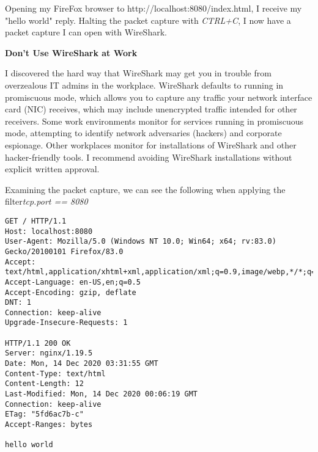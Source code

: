 Opening my FireFox browser to http://localhost:8080/index.html, I receive my "hello world" reply.  Halting the packet capture with \textit{CTRL+C}, I now have a packet capture I can open with WireShark.

\begin{sidebar}
\begin{center}
\textbf{Don't Use WireShark at Work}
\end{center}
I discovered the hard way that WireShark may get you in trouble from overzealous IT admins in the workplace.  WireShark defaults to running in promiscuous mode, which allows you to capture any traffic your network interface card (NIC) receives, which may include unencrypted traffic intended for other receivers.  Some work environments monitor for services running in promiscuous mode, attempting to identify network adversaries (hackers) and corporate espionage.  Other workplaces monitor for installations of WireShark and other hacker-friendly tools.  I recommend avoiding WireShark installations without explicit written approval.
\end{sidebar}

Examining the packet capture, we can see the following when applying the filter\textit{tcp.port == 8080}

\begin{code}
\vspace{-\baselineskip}
\begin{lstlisting}[belowskip=-\baselineskip]
GET / HTTP/1.1
Host: localhost:8080
User-Agent: Mozilla/5.0 (Windows NT 10.0; Win64; x64; rv:83.0) Gecko/20100101 Firefox/83.0
Accept: text/html,application/xhtml+xml,application/xml;q=0.9,image/webp,*/*;q=0.8
Accept-Language: en-US,en;q=0.5
Accept-Encoding: gzip, deflate
DNT: 1
Connection: keep-alive
Upgrade-Insecure-Requests: 1

HTTP/1.1 200 OK
Server: nginx/1.19.5
Date: Mon, 14 Dec 2020 03:31:55 GMT
Content-Type: text/html
Content-Length: 12
Last-Modified: Mon, 14 Dec 2020 00:06:19 GMT
Connection: keep-alive
ETag: "5fd6ac7b-c"
Accept-Ranges: bytes

hello world
\end{lstlisting}
\end{code}
